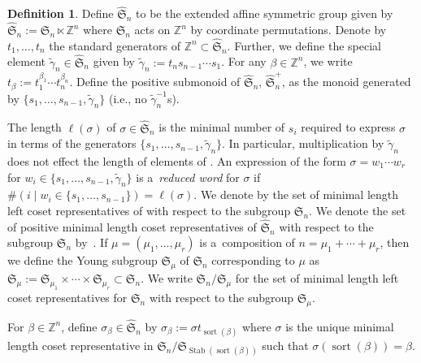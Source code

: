 \documentclass[10pt,a4paper]{amsart}
\numberwithin{equation}{section}
\theoremstyle{definition}
\newtheorem{Definition}[Theorem]{Definition}
\DeclareMathOperator{\sort}{sort}
\DeclareMathOperator{\Stab}{Stab}
\begin{document}
\begin{Definition}
 Define $\widehat{\mathfrak{S}}_n$ to be the extended affine symmetric group given by
$
 \widehat{\mathfrak{S}}_n:= \mathfrak{S}_n \ltimes \mathbb{Z}^{n}
$
 where $\mathfrak{S}_n$ acts on $\mathbb{Z}^{n}$ by coordinate permutations. Denote by $t_1,\dots, t_n$ the standard generators of $\mathbb{Z}^{n} \subset \widehat{\mathfrak{S}}_n$. Further, we define the special element $\widetilde{\gamma}_n \in \widehat{\mathfrak{S}}_n$ given by
$
 \widetilde{\gamma}_n:= t_ns_{n-1}\cdots s_1$.
 For any $\beta \in \mathbb{Z}^{n}$, we write
$
 t_{\beta}:= t_1^{\beta_1}\cdots t_n^{\beta_n}$.
 Define the positive submonoid of $\widehat{\mathfrak{S}}_n$, $\widehat{\mathfrak{S}}_n^{+}$, as the monoid generated by $\big\{s_1,\dots, s_{n-1},\widetilde{\gamma}_n \big\}$ (i.e., no $\widetilde{\gamma}_n^{-1}$s).

The length $\ell(\sigma)$ of $\sigma \in \widehat{\mathfrak{S}}_n$ is the minimal number of $s_i$ required to express $\sigma$ in terms of the generators $\big\{s_1,\dots,s_{n-1},\widetilde{\gamma}_n\big\}$.
In particular, multiplication by $\widetilde{\gamma}_n$ does not effect the length of elements of . An expression of the form $\sigma = w_1\cdots w_{r}$ for $w_i \in \{s_1,\dots,s_{n-1},\widetilde{\gamma}_n \}$ is a~\textit{reduced word} for $\sigma$ if $\#( i \mid w_i \in \{s_1,\dots,s_{n-1}\}) = \ell(\sigma)$.
 We denote by  the set of minimal length left coset representatives of  with respect to the subgroup $\mathfrak{S}_n$.
 We denote the set of positive minimal length coset representatives of $\widehat{\mathfrak{S}}_n$ with respect to the subgroup $\mathfrak{S}_n$ by~.
If $\mu = (\mu_1,\dots, \mu_r)$ is a~composition of $n = \mu_1+\cdots + \mu_r$, then we define the Young subgroup $\mathfrak{S}_{\mu}$ of $\mathfrak{S}_n$ corresponding to $\mu$ as $\mathfrak{S}_{\mu}:= \mathfrak{S}_{\mu_1}\times \cdots \times \mathfrak{S}_{\mu_r} \subset \mathfrak{S}_n$. We write $\mathfrak{S}_n/\mathfrak{S}_{\mu}$ for the set of minimal length left coset representatives for $\mathfrak{S}_n$ with respect to the subgroup $\mathfrak{S}_{\mu}$.

 For $\beta \in \mathbb{Z}^n$, define $\sigma_{\beta} \in \widehat{\mathfrak{S}}_n$ by
$
 \sigma_{\beta}:= \sigma t_{\sort(\beta)}
$
 where $\sigma$ is the unique minimal length coset representative in $\mathfrak{S}_n/\mathfrak{S}_{\Stab(\sort(\beta))}$ such that $\sigma(\sort(\beta))= \beta$.

\end{Definition}
\end{document}
